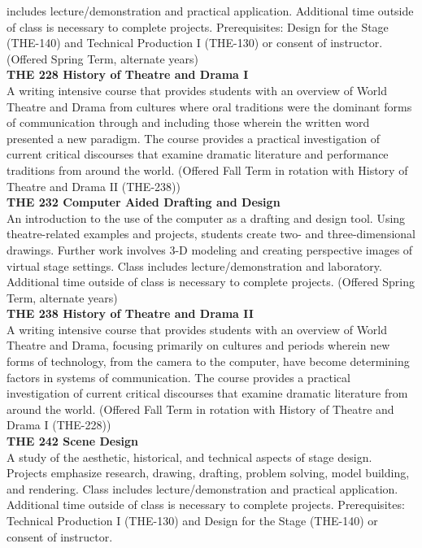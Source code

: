 \documentclass[
  letterpaper,
]{scrbook}
\begin{document}
includes lecture/demonstration and practical application. Additional
time outside of class is necessary to complete projects. Prerequisites:
Design for the Stage (THE-140) and Technical Production I (THE-130) or
consent of instructor. (Offered Spring Term, alternate years)\\
\textbf{THE 228 History of Theatre and Drama I}\\
A writing intensive course that provides students with an overview of
World Theatre and Drama from cultures where oral traditions were the
dominant forms of communication through and including those wherein the
written word presented a new paradigm. The course provides a practical
investigation of current critical discourses that examine dramatic
literature and performance traditions from around the world. (Offered
Fall Term in rotation with History of Theatre and Drama II (THE-238))\\
\textbf{THE 232 Computer Aided Drafting and Design}\\
An introduction to the use of the computer as a drafting and design
tool. Using theatre-related examples and projects, students create two-
and three-dimensional drawings. Further work involves 3-D modeling and
creating perspective images of virtual stage settings. Class includes
lecture/demonstration and laboratory. Additional time outside of class
is necessary to complete projects. (Offered Spring Term, alternate
years)\\
\textbf{THE 238 History of Theatre and Drama II}\\
A writing intensive course that provides students with an overview of
World Theatre and Drama, focusing primarily on cultures and periods
wherein new forms of technology, from the camera to the computer, have
become determining factors in systems of communication. The course
provides a practical investigation of current critical discourses that
examine dramatic literature from around the world. (Offered Fall Term in
rotation with History of Theatre and Drama I (THE-228))\\
\textbf{THE 242 Scene Design}\\
A study of the aesthetic, historical, and technical aspects of stage
design. Projects emphasize research, drawing, drafting, problem solving,
model building, and rendering. Class includes lecture/demonstration and
practical application. Additional time outside of class is necessary to
complete projects. Prerequisites: Technical Production I (THE-130) and
Design for the Stage (THE-140) or consent of instructor.\\
\end{document}

